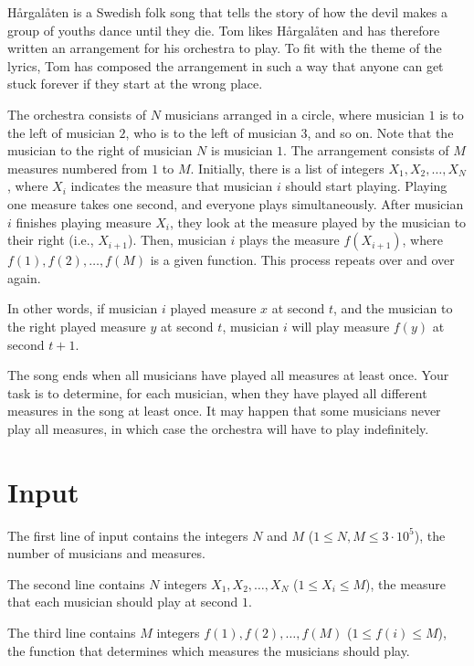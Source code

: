 
\noindent
Hårgalåten is a Swedish folk song that tells the story of how the devil makes a group of youths dance until they die.
Tom likes Hårgalåten and has therefore written an arrangement for his orchestra to play.
To fit with the theme of the lyrics, Tom has composed the arrangement in such a way that anyone can get stuck
forever if they start at the wrong place.

The orchestra consists of $N$ musicians arranged in a circle, where musician $1$ is to the left of musician $2$,
who is to the left of musician $3$, and so on. Note that the musician to the right of musician $N$
is musician $1$. The arrangement consists of $M$ measures numbered from $1$ to $M$.
Initially, there is a list of integers $X_1, X_2, \dots, X_N$, where $X_i$ indicates the measure that musician $i$
should start playing. Playing one measure takes one second, and everyone plays simultaneously. After musician $i$
finishes playing measure $X_i$, they look at the measure played by the musician to their right (i.e., $X_{i+1}$).
Then, musician $i$ plays the measure $f(X_{i+1})$, where $f(1), f(2), \dots, f(M)$ is a given function. This process
repeats over and over again.

In other words, if musician $i$ played measure $x$ at second $t$, and the musician to the right played measure $y$
at second $t$, musician $i$ will play measure $f(y)$ at second $t+1$. 

The song ends when all musicians have played all measures at least once. Your task is to determine, for each musician,
when they have played all different measures in the song at least once. It may happen that some musicians never play
all measures, in which case the orchestra will have to play indefinitely.

\section*{Input}
The first line of input contains the integers $N$ and $M$ ($1 \leq N,M \leq 3 \cdot 10^5$), the number of
musicians and measures.

The second line contains $N$ integers $X_1, X_2, \dots, X_N$ ($1 \leq X_i \leq M$), the measure that each musician
should play at second $1$.

The third line contains $M$ integers $f(1), f(2), \dots, f(M)$ ($1 \leq f(i) \leq M$), the function that determines
which measures the musicians should play.

